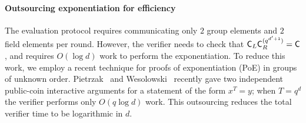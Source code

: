\paragraph{Outsourcing exponentiation for efficiency}
The evaluation protocol requires communicating only $2$ group elements and $2$ field elements per round. However, the verifier needs to check that $\mathsf{C}_L\mathsf{C}_R^{(q^{d'+1})}=\mathsf{C}$, and requires $O(\log d)$ work to perform the exponentiation. To reduce this work, we employ a recent technique for proofs of exponentiation (\textsf{PoE}) in groups of unknown order. Pietrzak~\cite{ITCS:Pietrzak19b} and Wesolowski~\cite{EC:Wesolowski19} recently gave two independent public-coin interactive arguments for a statement of the form $x^T = y$; when $T = q^d$ the verifier performs only $O(q \log d)$ work. This outsourcing reduces the total verifier time to be logarithmic in $d$. %

